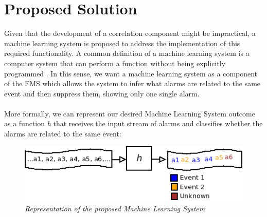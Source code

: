 \documentclass[10pt,a4paper]{article}
\begin{document}
  \section{Proposed Solution}

Given that the development of a correlation component might be impractical, a machine learning system is proposed to address the implementation of this required functionality. A common definition of a machine learning system is a computer system that can perform a function without being explicitly programmed \cite{mlsamuel}. In this sense, we want a machine learning system as a component of the FMS which allows the system to infer what alarms are related to the same event and then suppress them, showing only one single alarm. 
\\\\
More formally, we can represent our desired Machine Learning System outcome as a function \textit{h} that receives the input stream of alarms and classifies whether the alarms are related to the same event:

\begin{figure}[H]
 \includegraphics[scale=0.4]{MLS_hypothesis.png}
  \centering
  \caption{\textit{Representation of the proposed Machine Learning System}}
  \label{fig:mls_hypothesis}
\end{figure}	
\end{document}
